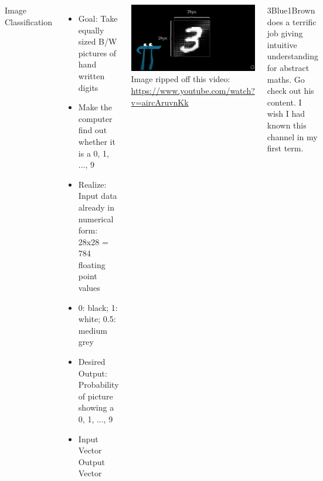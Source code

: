 \begin{frame}
%
\begin{columns}[T]
\begin{Large}
	{Image Classification}
	\vspace{12pt}
\end{Large}
%
\begin{itemize}
\item Goal: Take equally sized B/W pictures of hand written digits
\item Make the computer find out whether it is a 0, 1, ..., 9
\item Realize: Input data already in numerical form: 28x28 = 784 floating point values
\item 0: black; 1: white; 0.5: medium grey
\item Desired Output: Probability of picture showing a 0, 1, ..., 9
\item[\Thus] Input Vector \thus Output Vector
\end{itemize}
%
	\includegraphics[width=\linewidth]{./gfx/3b1b-raster}
	\scriptsize
	Image ripped off this video:	\url{https://www.youtube.com/watch?v=aircAruvnKk}
	
	\vspace{3pt}
	3Blue1Brown does a terrific job giving intuitive understanding for abstract maths. Go check out his content. I wish I had known this channel in my first term.
\end{columns}
%
\end{frame}


